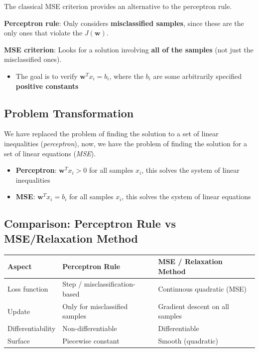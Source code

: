 \documentclass[11pt,a4paper]{article}
\theoremstyle{definition}
\theoremstyle{plain}
\theoremstyle{remark}
\begin{document}
The classical MSE criterion provides an alternative to the perceptron rule.

\begin{tcolorbox}[colback=green!5!white,colframe=green!75!black,title=\textbf{Key Difference: Perceptron vs MSE}]
\textbf{Perceptron rule}: Only considers \textbf{misclassified samples}, since these are the only ones that violate the $J(\mathbf{w})$.

\textbf{MSE criterion}: Looks for a solution involving \textbf{all of the samples} (not just the misclassified ones).
\begin{itemize}
    \item The goal is to verify $\mathbf{w}^T x_i = b_i$, where the $b_i$ are some arbitrarily specified \textbf{positive constants}
\end{itemize}
\end{tcolorbox}

\subsection{Problem Transformation}

We have replaced the problem of finding the solution to a set of linear inequalities (\textit{perceptron}), now, we have the problem of finding the solution for a set of linear equations (\textit{MSE}).

\begin{itemize}
    \item \textbf{Perceptron}: $\mathbf{w}^T x_i > 0$ for all samples $x_i$, this solves the system of linear inequalities
    
    \item \textbf{MSE}: $\mathbf{w}^T x_i = b_i$ for all samples $x_i$, this solves the system of linear equations
\end{itemize}

\subsection{Comparison: Perceptron Rule vs MSE/Relaxation Method}

\begin{center}
\begin{tabular}{|l|l|l|}
\hline
\textbf{Aspect} & \textbf{Perceptron Rule} & \textbf{MSE / Relaxation Method} \\
\hline
Loss function & Step / misclassification-based & Continuous quadratic (MSE) \\
\hline
Update & Only for misclassified samples & Gradient descent on all samples \\
\hline
Differentiability & Non-differentiable & Differentiable \\
\hline
Surface & Piecewise constant & Smooth (quadratic) \\
\hline
\end{tabular}
\end{center}
\end{document}
